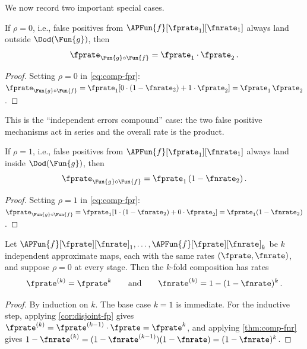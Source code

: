 \documentclass[ ../main.tex]{subfiles}
\begin{document}
We now record two important special cases.

\begin{corollary}
\label{cor:disjoint-fp}
If $\rho = 0$, i.e., false positives from
$\APFun{f}[\fprate_1][\fnrate_1]$ always land outside
$\Dod(\Fun{g})$, then
\begin{equation}
\label{eq:fpr-product}
\fprate_{\Fun{g} \circ \Fun{f}} = \fprate_1 \cdot \fprate_2\,.
\end{equation}
\end{corollary}
\begin{proof}
Setting $\rho = 0$ in \cref{eq:comp-fpr}:
$\fprate_{\Fun{g} \circ \Fun{f}}
= \fprate_1 [0 \cdot (1-\fnrate_2) + 1 \cdot \fprate_2]
= \fprate_1 \, \fprate_2$.
\end{proof}

This is the ``independent errors compound'' case: the two false positive
mechanisms act in series and the overall rate is the product.

\begin{corollary}
\label{cor:full-overlap}
If $\rho = 1$, i.e., false positives from
$\APFun{f}[\fprate_1][\fnrate_1]$ always land inside
$\Dod(\Fun{g})$, then
\begin{equation}
\label{eq:fpr-full-overlap}
\fprate_{\Fun{g} \circ \Fun{f}} = \fprate_1 \,(1-\fnrate_2)\,.
\end{equation}
\end{corollary}
\begin{proof}
Setting $\rho = 1$ in \cref{eq:comp-fpr}:
$\fprate_{\Fun{g} \circ \Fun{f}}
= \fprate_1 [1 \cdot (1-\fnrate_2) + 0 \cdot \fprate_2]
= \fprate_1 (1-\fnrate_2)$.
\end{proof}

\begin{corollary}
\label{cor:k-fold}
Let
$\APFun{f}[\fprate][\fnrate]_1, \ldots,
 \APFun{f}[\fprate][\fnrate]_k$
be $k$ independent approximate maps, each with the same rates
$(\fprate, \fnrate)$, and suppose $\rho = 0$ at every stage.
Then the $k$-fold composition has rates
\begin{equation}
\label{eq:k-fold}
\fprate^{(k)} = \fprate^k
\qquad\text{and}\qquad
\fnrate^{(k)} = 1 - (1-\fnrate)^k\,.
\end{equation}
\end{corollary}
\begin{proof}
By induction on $k$.  The base case $k=1$ is immediate.
For the inductive step, applying \cref{cor:disjoint-fp}
gives
$\fprate^{(k)} = \fprate^{(k-1)} \cdot \fprate = \fprate^k$,
and applying \cref{thm:comp-fnr} gives
$1 - \fnrate^{(k)} = (1-\fnrate^{(k-1)})(1-\fnrate) = (1-\fnrate)^k$.
\end{proof}
\end{document}

